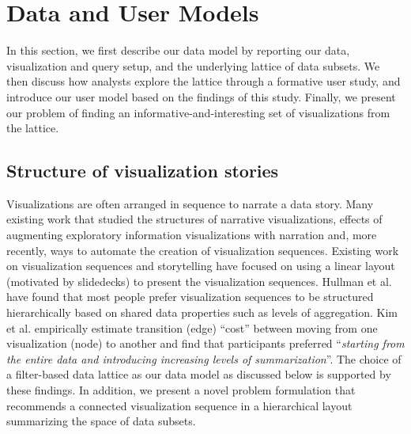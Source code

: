 \section{Data and User Models} 

In this section, we first describe our data model by reporting our data, visualization and query setup, and the underlying lattice of data subsets. We then discuss how analysts explore the lattice through a formative user study, and introduce our user model based on the findings of this study. Finally, we present our problem of finding an informative-and-interesting set of visualizations from the lattice.

\subsection{Structure of visualization stories}
\npar {} 
Visualizations are often arranged in sequence to narrate a data story. Many existing work that studied the structures of narrative visualizations\cite{Segel2010,Hullman2017}, effects of augmenting exploratory information visualizations with narration\cite{Boy2015} and, more recently, ways to automate the creation of visualization sequences\cite{Hullman2013,Kim2017}. Existing work on visualization sequences and storytelling have focused on using a linear layout (motivated by slidedecks) to present the visualization sequences. Hullman et al. \cite{Hullman2017} have found that most people prefer visualization sequences to be structured hierarchically based on shared data properties such as levels of aggregation. %
Kim et al. \cite{Kim2017} empirically estimate transition (edge) ``cost'' between moving from one visualization (node) to another and find that participants preferred ``\textit{starting from the entire data and introducing increasing levels of summarization}''. The choice of a filter-based data lattice as our data model as discussed below is supported by these findings. In addition, we present a novel problem formulation that recommends a connected visualization sequence in a hierarchical layout summarizing the space of data subsets.


